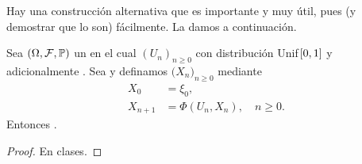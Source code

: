Hay una construcción alternativa que es importante y muy útil, pues  (y demostrar que lo son) fácilmente.
La damos a continuación.

\begin{thm}
Sea $(\Omega,\mathcal{F},\mathbb{P})$ un  en el cual  $(U_n)_{n\geq0}$ con distribución Unif$\hspace{0.1em}[0,1]$ y adicionalmente .
Sea  y definamos $\big(X_n\big)_{n\geq0}$ mediante
\begin{equation}
\begin{aligned}
X_0&=\xi_0,\\
X_{n+1}&=\Phi(U_n,X_n),\quad n\geq0.
\end{aligned}\label{eq:constrDirMarkov}
\end{equation}
Entonces .
\end{thm}

\begin{proof}
En clases. \ucmark
\end{proof}


